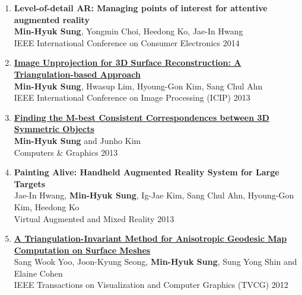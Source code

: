 \documentclass[letterpaper,10pt]{article} %
\newcommand{\blankline}{\quad\pagebreak[2]}
\begin{document}
{{\begin{enumerate}
\item \label{icce14}
\textbf{Level-of-detail AR: Managing points of interest for attentive augmented reality}\\
\textbf{Min-Hyuk Sung}, Yongmin Choi, Heedong Ko, Jae-In Hwang\\
IEEE International Conference on Consumer Electronics 2014\\
\blankline

\item \label{icip13}
\href{http://dx.doi.org/10.1109/icip.2013.6738034}{\textbf{Image Unprojection for 3D Surface Reconstruction: A Triangulation-based Approach}}\\
\textbf{Min-Hyuk Sung}, Hwasup Lim, Hyoung-Gon Kim, Sang Chul Ahn\\
IEEE International Conference on Image Processing (ICIP) 2013\\
\blankline

\item \label{cg13}
\href{http://dx.doi.org/10.1016/j.cag.2012.11.002}{\textbf{Finding the M-best Consistent Correspondences between 3D Symmetric Objects}} \\
\textbf{Min-Hyuk Sung} and Junho Kim\\
Computers \& Graphics 2013\\
\blankline

\item \label{vamr13}
\textbf{Painting Alive: Handheld Augmented Reality System for Large Targets} \\
Jae-In Hwang, \textbf{Min-Hyuk Sung}, Ig-Jae Kim, Sang Chul Ahn, Hyoung-Gon Kim, Heedong Ko\\
Virtual Augmented and Mixed Reality 2013\\
\blankline

\item \label{tvcg12}
\href{http://dx.doi.org/10.1109/TVCG.2012.29}{\textbf{A Triangulation-Invariant Method for Anisotropic Geodesic Map Computation on Surface Meshes}} \\
Sang Wook Yoo, Joon-Kyung Seong, \textbf{Min-Hyuk Sung}, Sung Yong Shin and Elaine Cohen\\
IEEE Transactions on Visualization and Computer Graphics (TVCG) 2012\\
\blankline


\end{enumerate}}}
\end{document}

